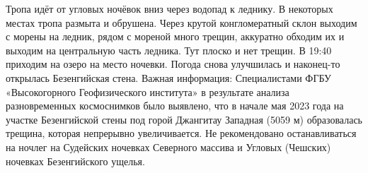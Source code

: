 Тропа идёт от угловых ночёвок вниз через водопад к леднику. В некоторых местах тропа размыта и обрушена. Через крутой конгломератный склон выходим с морены на ледник, рядом с мореной много трещин, аккуратно обходим их и выходим на центральную часть ледника. Тут плоско и нет трещин. В 19:40 приходим на озеро на место ночевки. Погода снова улучшилась и наконец-то открылась Безенгийская стена.
Важная информация: Специалистами ФГБУ «Высокогорного Геофизического института» в результате анализа разновременных космоснимков было выявлено, что в начале мая 2023 года на участке Безенгийской стены под горой Джангитау Западная (5059 м) образовалась трещина, которая непрерывно увеличивается. Не рекомендовано останавливаться на ночлег на Судейских ночевках Северного массива и Угловых (Чешских) ночевках Безенгийского ущелья.












    \FloatBarrier
